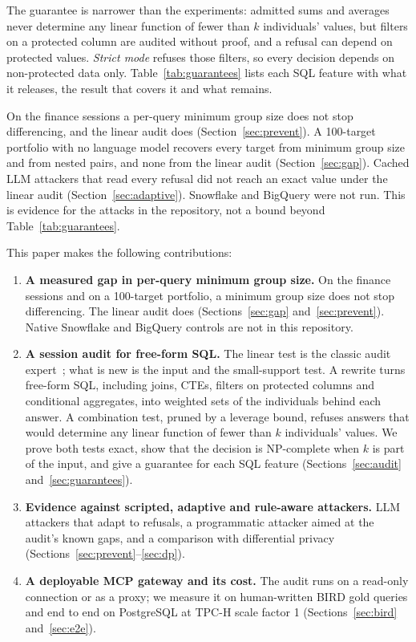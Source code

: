 \documentclass[sigconf,nonacm]{acmart}
\begin{document}
The guarantee is narrower than the experiments: admitted sums and averages never determine any linear function of fewer than $k$ individuals' values, but filters on a protected column are audited without proof, and a refusal can depend on protected values. \emph{Strict mode} refuses those filters, so every decision depends on non-protected data only. Table~\ref{tab:guarantees} lists each SQL feature with what it releases, the result that covers it and what remains.

On the finance sessions a per-query minimum group size does not stop differencing, and the linear audit does (Section~\ref{sec:prevent}). A 100-target portfolio with no language model recovers every target from minimum group size and from nested pairs, and none from the linear audit (Section~\ref{sec:gap}). Cached LLM attackers that read every refusal did not reach an exact value under the linear audit (Section~\ref{sec:adaptive}). Snowflake and BigQuery were not run. This is evidence for the attacks in the repository, not a bound beyond Table~\ref{tab:guarantees}.

This paper makes the following contributions:
\begin{enumerate}
\item \textbf{A measured gap in per-query minimum group size.} On the finance sessions and on a 100-target portfolio, a minimum group size does not stop differencing. The linear audit does (Sections~\ref{sec:gap} and~\ref{sec:prevent}). Native Snowflake and BigQuery controls are not in this repository.
\item \textbf{A session audit for free-form SQL.} The linear test is the classic audit expert~\cite{chin1982auditing}; what is new is the input and the small-support test. A rewrite turns free-form SQL, including joins, CTEs, filters on protected columns and conditional aggregates, into weighted sets of the individuals behind each answer. A combination test, pruned by a leverage bound, refuses answers that would determine any linear function of fewer than $k$ individuals' values. We prove both tests exact, show that the decision is NP-complete when $k$ is part of the input, and give a guarantee for each SQL feature (Sections~\ref{sec:audit} and~\ref{sec:guarantees}).
\item \textbf{Evidence against scripted, adaptive and rule-aware attackers.} LLM attackers that adapt to refusals, a programmatic attacker aimed at the audit's known gaps, and a comparison with differential privacy (Sections~\ref{sec:prevent}--\ref{sec:dp}).
\item \textbf{A deployable MCP gateway and its cost.} The audit runs on a read-only connection or as a proxy; we measure it on human-written BIRD gold queries and end to end on PostgreSQL at TPC-H scale factor 1 (Sections~\ref{sec:bird} and~\ref{sec:e2e}).
\end{enumerate}
\end{document}
